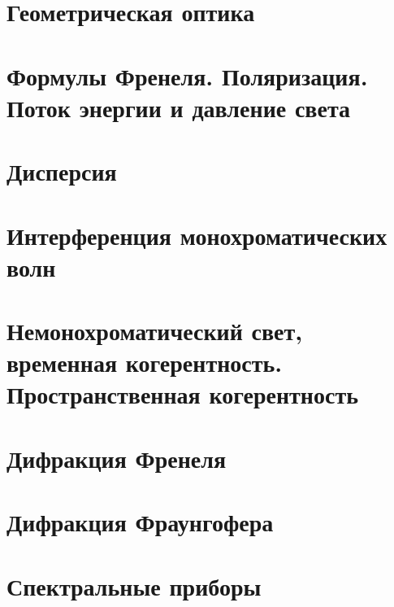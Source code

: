 \maketitle
\newpage

\section{Геометрическая оптика}






\section{Формулы Френеля. Поляризация. Поток энергии и давление света}



%

\section{Дисперсия}



%

\section{Интерференция монохроматических волн}





\section{Немонохроматический свет, временная когерентность. Пространственная когерентность}



%

\section{Дифракция Френеля}

%
%
%

\section{Дифракция Фраунгофера}
%
%
%
%

\section{Спектральные приборы}
%
%
%
%

